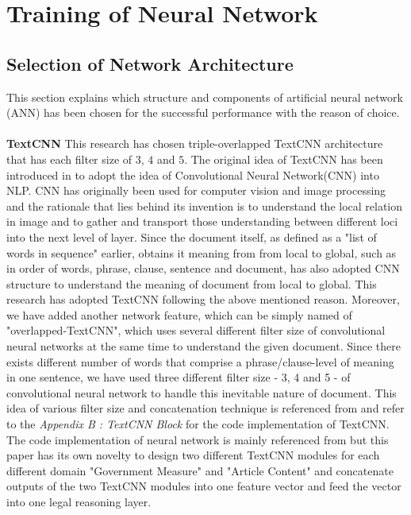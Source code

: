 \documentclass[sigconf]{acmart}
\begin{document}
\section{Training of Neural Network}
\subsection{Selection of Network Architecture}
This section explains which structure and components of artificial neural network (ANN) has been chosen for the successful performance with the reason of choice.\\\\
\textbf{TextCNN} This research has chosen triple-overlapped TextCNN architecture that has each filter size of \(3\), \(4\) and \(5\). The original idea of TextCNN has been introduced in \cite{DBLP:journals/corr/Kim14f} to adopt the idea of Convolutional Neural Network(CNN)\cite{Fukushima1983, Waibel1989, Yann1989} into NLP. CNN has originally been used for computer vision and image processing and the rationale that lies behind its invention is to understand the local relation in image and to gather and transport those understanding between different loci into the next level of layer. Since the document itself, as defined as a "list of words in sequence" earlier, obtains it meaning from from local to global, such as in order of words, phrase, clause, sentence and document, \cite{DBLP:journals/corr/Kim14f} has also adopted CNN structure to understand the meaning of document from local to global.
This research has adopted TextCNN following the above mentioned reason. Moreover, we have added another network feature, which can be simply named of "overlapped-TextCNN", which uses several different filter size of convolutional neural networks at the same time to understand the given document. Since there exists different number of words that comprise a phrase/clause-level of meaning in one sentence, we have used three different filter size - 3, 4 and 5 - of convolutional neural network to handle this inevitable nature of document. This idea of various filter size and concatenation technique is referenced from \cite{Randolph2018} and refer to the \textit{Appendix B : TextCNN Block} for the code implementation of TextCNN. The code implementation of neural network is mainly referenced from \cite{Randolph2018} but this paper has its own novelty to design two different TextCNN modules for each different domain "Government Measure" and "Article Content" and concatenate outputs of the two TextCNN modules into one feature vector and feed the vector into one legal reasoning layer.\\\\
\end{document}
